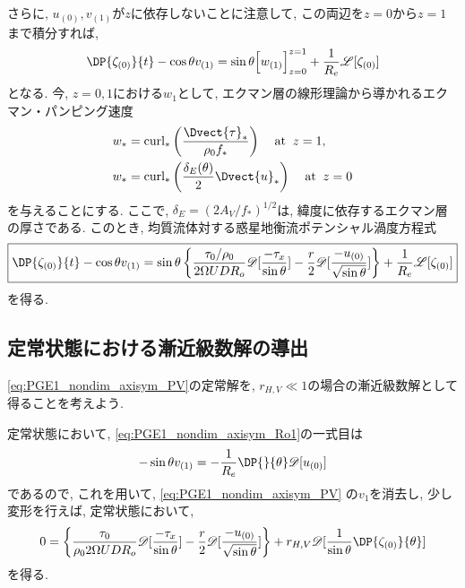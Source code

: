 さらに, $u_{(0)}, v_{(1)}$が$z$に依存しないことに注意して, この両辺を$z=0$から$z=1$まで積分すれば, 
\begin{equation}
    \DP{\zeta_{(0)}}{t} - \cos{\theta} v_{(1)} 
  = \sin{\theta} \Big[ w_{(1)} \Big]_{z=0}^{z=1} + \dfrac{1}{R_e} \mathscr{L}[\zeta_{(0)}]
\end{equation}
となる. 
今, $z=0,1$における$w_1$として, エクマン層の線形理論から導かれるエクマン・パンピング速度
\begin{align*}
  w_* &= {\rm curl}_* \left(\dfrac{\Dvect{\tau}_*}{\rho_0 f_*}\right) \;\;\;\; {\rm at \;\;}z=1, \\
  w_* &= {\rm curl}_* \left( \dfrac{\delta_E(\theta)}{2} \Dvect{u}_* \right) \;\;\;\; {\rm at \;\;}z=0 
\end{align*}
を与えることにする.  
ここで, $\delta_E=(2A_V/f_*)^{1/2}$は, 緯度に依存するエクマン層の厚さである. 
このとき, 均質流体対する惑星地衡流ポテンシャル渦度方程式
\begin{equation}
\boxed{
  \DP{\zeta_{(0)}}{t} - \cos{\theta} v_{(1)}
  = \sin{\theta} \left\{ \dfrac{\tau_0/\rho_0}{2\Omega U D R_o} \mathscr{D}[\dfrac{-\tau_x}{\sin{\theta}}] 
                   - \dfrac{r}{2} \mathscr{D}[\dfrac{-u_{(0)}}{\sqrt{\sin{\theta}}}] \right\}
    + \dfrac{1}{R_e} \mathscr{L}[\zeta_{(0)}]
}
\label{eq:PGE1_nondim_axisym_PV}
\end{equation}
を得る. 

\subsection{定常状態における漸近級数解の導出}
\eqref{eq:PGE1_nondim_axisym_PV}の定常解を, 
$r_{H,V}\ll 1$の場合の漸近級数解として得ることを考えよう. 

定常状態において, \eqref{eq:PGE1_nondim_axisym_Ro1}の一式目は
\begin{equation}
  - \sin{\theta} v_{(1)} = - \dfrac{1}{R_e}\DP{}{\theta} \mathscr{D}[u_{(0)}]
\label{eq:PGE1_nondim_axisym_Ro1_xmomentum_static}
\end{equation}
であるので, これを用いて, 
\eqref{eq:PGE1_nondim_axisym_PV} の$v_1$を消去し, 
少し変形を行えば, 定常状態において, 
\begin{equation}
 0 = \left\{ \dfrac{\tau_0}{\rho_0 2\Omega U D R_o} \mathscr{D}[\dfrac{-\tau_x}{\sin{\theta}}] 
                   - \dfrac{r}{2} \mathscr{D}[\dfrac{-u_{(0)}}{\sqrt{\sin{\theta}}}] \right\}
    + r_{H,V} \mathscr{D}[\dfrac{1}{\sin{\theta}}\DP{\zeta_{(0)}}{\theta}]
\label{eq:PGE1_nondim_axisym_PV_static}
\end{equation}
を得る. 

